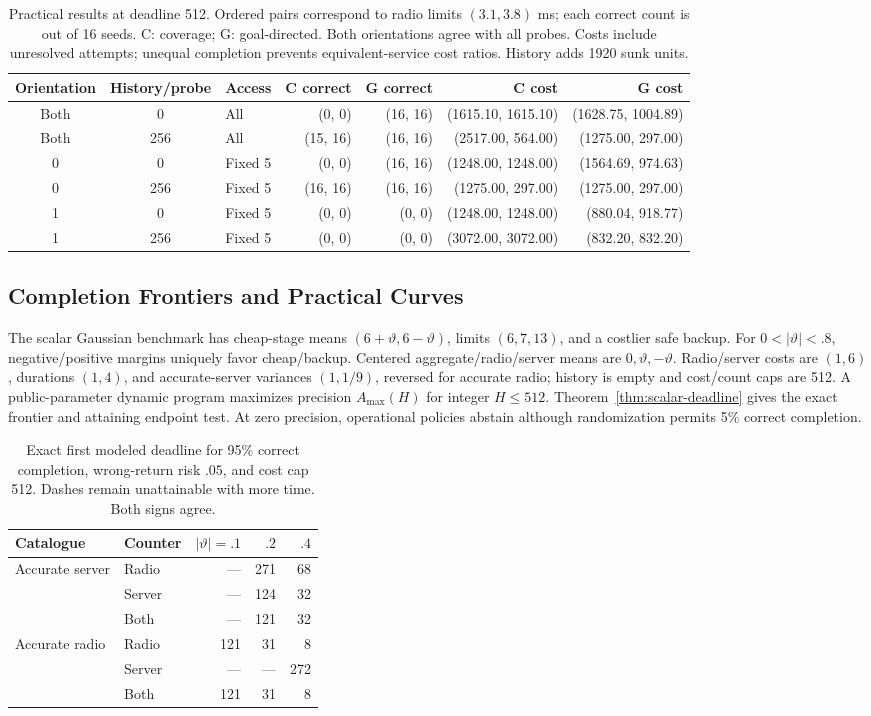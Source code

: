 \begin{table}[t]
\centering\small
\caption{Practical results at deadline 512. Ordered pairs correspond to radio limits $(3.1,3.8)$ ms; each correct count is out of 16 seeds. C: coverage; G: goal-directed. Both orientations agree with all probes. Costs include unresolved attempts; unequal completion prevents equivalent-service cost ratios. History adds 1920 sunk units.}
\label{tab:v42-practical}
\begin{tabular}{@{}cclrrrr@{}}
\toprule
Orientation&History/probe&Access&C correct&G correct&C cost&G cost\\
\midrule
Both&0&All&(0, 0)&(16, 16)&(1615.10, 1615.10)&(1628.75, 1004.89)\\
Both&256&All&(15, 16)&(16, 16)&(2517.00, 564.00)&(1275.00, 297.00)\\
0&0&Fixed 5&(0, 0)&(16, 16)&(1248.00, 1248.00)&(1564.69, 974.63)\\
0&256&Fixed 5&(16, 16)&(16, 16)&(1275.00, 297.00)&(1275.00, 297.00)\\
1&0&Fixed 5&(0, 0)&(0, 0)&(1248.00, 1248.00)&(880.04, 918.77)\\
1&256&Fixed 5&(0, 0)&(0, 0)&(3072.00, 3072.00)&(832.20, 832.20)\\
\bottomrule
\end{tabular}
\end{table}

\subsection{Completion Frontiers and Practical Curves}
\label{app:deadline-study}
The scalar Gaussian benchmark has cheap-stage means $(6+\vartheta,6-\vartheta)$, limits $(6,7,13)$, and a costlier safe backup. For $0<|\vartheta|<.8$, negative/positive margins uniquely favor cheap/backup. Centered aggregate/radio/server means are $0,\vartheta,-\vartheta$. Radio/server costs are $(1,6)$, durations $(1,4)$, and accurate-server variances $(1,1/9)$, reversed for accurate radio; history is empty and cost/count caps are 512. A public-parameter dynamic program maximizes precision $A_{\max}(H)$ for integer $H\leq512$. Theorem~\ref{thm:scalar-deadline} gives the exact frontier and attaining endpoint test. At zero precision, operational policies abstain although randomization permits 5\% correct completion.
\begin{table}[t]
\centering\small
\caption{Exact first modeled deadline for 95\% correct completion, wrong-return risk $.05$, and cost cap 512. Dashes remain unattainable with more time. Both signs agree.}
\label{tab:v42-targets}
\begin{tabular}{@{}llrrr@{}}
\toprule
Catalogue&Counter&$|\vartheta|=.1$&$.2$&$.4$\\
\midrule
Accurate server&Radio&---&271&68\\
&Server&---&124&32\\
&Both&---&121&32\\
Accurate radio&Radio&121&31&8\\
&Server&---&---&272\\
&Both&121&31&8\\
\bottomrule
\end{tabular}
\end{table}


